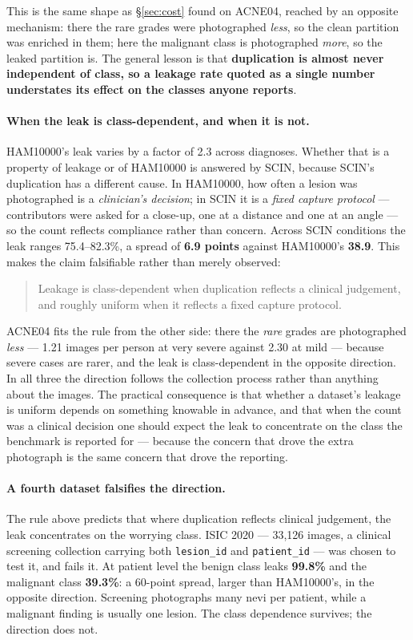 \documentclass[11pt]{article}
\begin{document}
This is the same shape as \S\ref{sec:cost} found on ACNE04, reached by an opposite
mechanism: there the rare grades were photographed \emph{less}, so the clean partition was
enriched in them; here the malignant class is photographed \emph{more}, so the leaked
partition is. The general lesson is that \textbf{duplication is almost never independent of
class, so a leakage rate quoted as a single number understates its effect on the classes
anyone reports}.

\paragraph{When the leak is class-dependent, and when it is not.}
HAM10000's leak varies by a factor of 2.3 across diagnoses. Whether that is a property of
leakage or of HAM10000 is answered by SCIN, because SCIN's duplication has a different
cause. In HAM10000, how often a lesion was photographed is a \emph{clinician's decision};
in SCIN it is a \emph{fixed capture protocol} --- contributors were asked for a close-up,
one at a distance and one at an angle --- so the count reflects compliance rather than
concern. Across SCIN conditions the leak ranges 75.4--82.3\%, a spread of \textbf{6.9
points} against HAM10000's \textbf{38.9}. This makes the claim falsifiable rather than
merely observed:

\begin{quote}
Leakage is class-dependent when duplication reflects a clinical judgement, and roughly
uniform when it reflects a fixed capture protocol.
\end{quote}

ACNE04 fits the rule from the other side: there the \emph{rare} grades are photographed
\emph{less} --- 1.21 images per person at very severe against 2.30 at mild --- because
severe cases are rarer, and the leak is class-dependent in the opposite direction. In all
three the direction follows the collection process rather than anything about the images.
The practical consequence is that whether a dataset's leakage is uniform depends on
something knowable in advance, and that when the count was a clinical decision one should
expect the leak to concentrate on the class the benchmark is reported for --- because the
concern that drove the extra photograph is the same concern that drove the reporting.

\paragraph{A fourth dataset falsifies the direction.}
The rule above predicts that where duplication reflects clinical judgement, the leak
concentrates on the worrying class. ISIC 2020 --- 33{,}126 images, a clinical screening
collection carrying both \texttt{lesion\_id} and \texttt{patient\_id} --- was chosen to test
it, and fails it. At patient level the benign class leaks \textbf{99.8\%} and the malignant
class \textbf{39.3\%}: a 60-point spread, larger than HAM10000's, in the opposite direction.
Screening photographs many nevi per patient, while a malignant finding is usually one
lesion. The class dependence survives; the direction does not.
\end{document}
